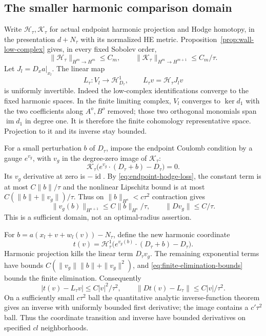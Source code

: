 \documentclass[11pt]{amsart}
\theoremstyle{definition}
\theoremstyle{remark}
\newcommand{\id}{\operatorname{id}}
\newcommand{\cH}{\mathcal H}
\newcommand{\im}{\operatorname{im}}
\begin{document}
\subsection{The smaller harmonic comparison domain}
Write $\mathcal H_\tau,\mathcal K_\tau$ for actual endpoint harmonic
projection and Hodge homotopy, in the presentation $d+N_\tau$ with
its normalized HE metric. Proposition~\ref{prop:wall-low-complex}
gives, in every fixed Sobolev order,
\begin{equation}\label{eq:endpoint-hodge-loss}
 \|\mathcal H_\tau\|_{H^m\to H^m}\le C_m,\qquad
 \|\mathcal K_\tau\|_{H^m\to H^{m+1}}\le C_m/\tau.
\end{equation}
Let $J_l=D_xa|_{x_l}$. The linear map
\begin{equation}\label{eq:transition-linear}
 L_\tau:V_l\longrightarrow\cH^1_{D_\tau},\qquad
 L_\tau v=\mathcal H_\tau J_lv
\end{equation}
is uniformly invertible. Indeed the low-complex identifications
converge to the fixed harmonic spaces. In the finite limiting complex,
$V_l$ converges to $\ker d_1$ with the two coefficients along
$A^o,B^o$ removed; those two orthogonal monomials span $\im d_1$
in degree one. It is therefore the finite cohomology representative
space. Projection to it and its inverse stay bounded.

For a small perturbation $b$ of $D_\tau$, impose the endpoint
Coulomb condition by a gauge $e^{v_g}$, with $v_g$ in the degree-zero
image of $\mathcal K_\tau$:
\[
 \mathcal K_\tau\bigl(e^{v_g}\cdot(D_\tau+b)-D_\tau\bigr)=0.
\]
Its $v_g$ derivative at zero is $-\id$. By
\eqref{eq:endpoint-hodge-loss}, the constant term is at most
$C\|b\|/\tau$ and the nonlinear Lipschitz bound is at most
$C(\|b\|+\|v_g\|)/\tau$. Thus on $\|b\|_{H^s}<c\tau^2$
contraction gives
\begin{equation}\label{eq:endpoint-gauge-bound}
 \|v_g(b)\|_{H^{s+1}}\le C\|b\|_{H^s}/\tau,\qquad
 \|Dv_g\|\le C/\tau.
\end{equation}
This is a sufficient domain, not an optimal-radius assertion.

For $b=a(x_l+v+w_l(v))-N_\tau$, define the new harmonic coordinate
\[
 t(v)=\mathcal H_\tau^1
       \bigl(e^{v_g(b)}\cdot(D_\tau+b)-D_\tau\bigr).
\]
Harmonic projection kills the linear term $D_\tau v_g$. The remaining
exponential terms have bounds
$C(\|v_g\|\|b\|+\|v_g\|^2)$, and
\eqref{eq:finite-elimination-bounds} bounds the finite elimination.
Consequently
\begin{equation}\label{eq:transition-estimate}
 |t(v)-L_\tau v|\le C|v|^2/\tau^2,\qquad
 \|Dt(v)-L_\tau\|\le C|v|/\tau^2.
\end{equation}
On a sufficiently small $c\tau^2$ ball the quantitative analytic
inverse-function theorem gives an inverse with uniformly bounded
first derivative; the image contains a $c'\tau^2$ ball. Thus the
coordinate transition and inverse have bounded derivatives on
specified $cl$ neighborhoods.
\end{document}
